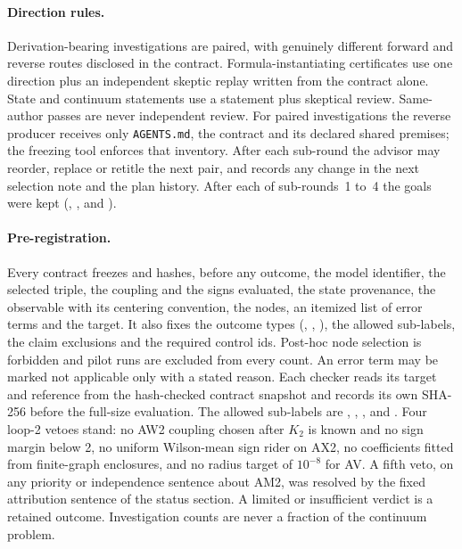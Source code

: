 \paragraph{Direction rules.}
Derivation-bearing investigations are paired, with genuinely different forward
and reverse routes disclosed in the contract. Formula-instantiating
certificates use one direction plus an independent skeptic replay written from
the contract alone. State and continuum statements use a statement plus
skeptical review. Same-author passes are never independent review. For paired
investigations the reverse producer receives only \texttt{AGENTS.md}, the
contract and its declared shared premises; the freezing tool enforces that
inventory. After each sub-round the advisor may reorder, replace or retitle the
next pair, and records any change in the next selection note and the plan
history. After each of sub-rounds~1 to~4 the goals were kept
(,
,
 and
).

\paragraph{Pre-registration.}
Every contract freezes and hashes, before any outcome, the model identifier,
the selected triple, the coupling and the signs evaluated, the state
provenance, the observable with its centering convention, the nodes, an
itemized list of error terms and the target. It also fixes the outcome types
(, , ), the
allowed sub-labels, the claim exclusions and the required control ids.
Post-hoc node selection is forbidden and pilot runs are excluded from every
count. An error term may be marked not applicable only with a stated reason.
Each checker reads its target and reference from the hash-checked contract
snapshot and records its own SHA-256 before the full-size evaluation. The
allowed sub-labels are ,
, ,
 and
. Four loop-2 vetoes stand: no
AW2 coupling chosen after $K_2$ is known and no sign margin below 2, no uniform
Wilson-mean sign rider on AX2, no coefficients fitted from finite-graph
enclosures, and no radius target of $10^{-8}$ for AV. A fifth veto, on any
priority or independence sentence about AM2, was resolved by the fixed
attribution sentence of the status section. A limited or insufficient verdict is a
retained outcome. Investigation counts are never a fraction of the continuum
problem.
